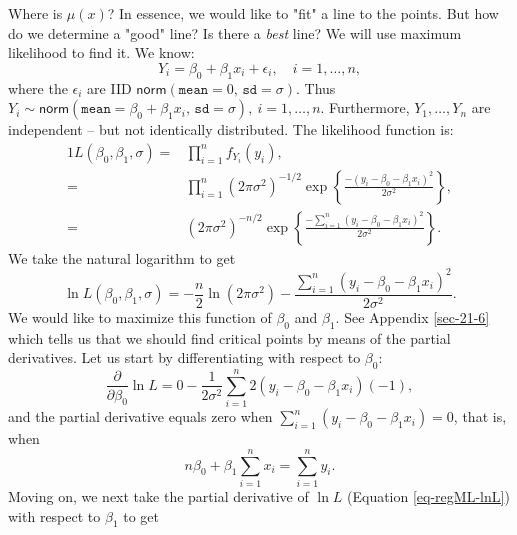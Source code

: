 Where is \( \mu(x) \)? In essence, we would like to "fit" a line to
the points. But how do we determine a "good" line? Is there a \emph{best}
line? We will use maximum likelihood  to find it. We know:
\begin{equation}
Y_{i} = \beta_{0} + \beta_{1}x_{i} + \epsilon_{i},\quad i=1,\ldots,n,
\end{equation}
where the \( \epsilon_{i} \) are IID
\(\mathsf{norm}(\mathtt{mean}=0,\,\mathtt{sd}=\sigma) \). Thus \(
Y_{i}\sim\mathsf{norm}(\mathtt{mean}=\beta_{0}+\beta_{1}x_{i},\,\mathtt{sd}=\sigma),\
i=1,\ldots,n \). Furthermore, \( Y_{1},\ldots,Y_{n} \) are independent
-- but not identically distributed. The likelihood
function  is:
\begin{alignat}{1}
L(\beta_{0},\beta_{1},\sigma)= & \prod_{i=1}^{n}f_{Y_{i}}(y_{i}),\\
= & \prod_{i=1}^{n}(2\pi\sigma^{2})^{-1/2}\exp\left\{ \frac{-(y_{i}-\beta_{0}-\beta_{1}x_{i})^{2}}{2\sigma^{2}}\right\} ,\\
= & (2\pi\sigma^{2})^{-n/2}\exp\left\{ \frac{-\sum_{i=1}^{n}(y_{i}-\beta_{0}-\beta_{1}x_{i})^{2}}{2\sigma^{2}}\right\} .
\end{alignat}
We take the natural logarithm to get
\begin{equation}
\label{eq-regML-lnL}
\ln L(\beta_{0},\beta_{1},\sigma)=-\frac{n}{2}\ln(2\pi\sigma^{2})-\frac{\sum_{i=1}^{n}(y_{i}-\beta_{0}-\beta_{1}x_{i})^{2}}{2\sigma^{2}}.
\end{equation}
We would like to maximize this function of \( \beta_{0} \) and \(
\beta_{1} \). See Appendix \ref{sec-21-6} which tells us that
we should find critical points by means of the partial
derivatives. Let us start by differentiating with respect to
\(\beta_{0} \):
\begin{equation}
\frac{\partial}{\partial\beta_{0}}\ln L=0-\frac{1}{2\sigma^{2}}\sum_{i=1}^{n}2(y_{i}-\beta_{0}-\beta_{1}x_{i})(-1),
\end{equation}
and the partial derivative equals zero when \(
\sum_{i=1}^{n}(y_{i}-\beta_{0}-\beta_{1}x_{i}) = 0 \), that is, when
\begin{equation}
\label{eq-regML-a}
n \beta_{0} + \beta_{1} \sum_{i=1}^{n} x_{i} = \sum_{i = 1}^{n}y_{i}.
\end{equation}
Moving on, we next take the partial derivative of \( \ln L \)
(Equation \eqref{eq-regML-lnL}) with respect to \( \beta_{1} \) to get

